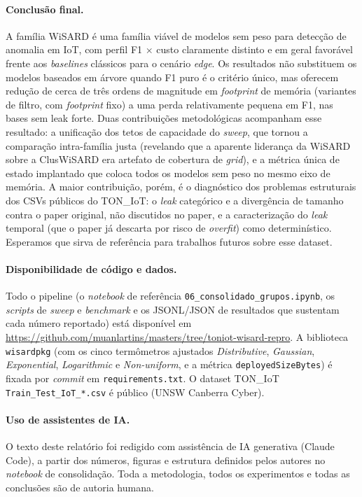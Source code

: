 \paragraph{Conclusão final.} A família WiSARD é uma família viável de
modelos sem peso para detecção de anomalia em IoT, com perfil
F1 $\times$ custo claramente distinto e em geral favorável frente aos
\emph{baselines} clássicos para o cenário \emph{edge}. Os resultados
não substituem os modelos baseados em árvore quando F1 puro é o
critério único, mas oferecem redução de cerca de três ordens de
magnitude em \emph{footprint} de memória (variantes de filtro, com
\emph{footprint} fixo) a uma perda relativamente pequena em F1, nas
bases sem leak forte. Duas contribuições metodológicas acompanham esse
resultado: a unificação dos tetos de capacidade do \emph{sweep}, que
tornou a comparação intra-família justa (revelando que a aparente
liderança da WiSARD sobre a ClusWiSARD era artefato de cobertura de
\emph{grid}), e a métrica única de estado implantado que coloca todos
os modelos sem peso no mesmo eixo de memória. A maior contribuição,
porém, é o diagnóstico dos problemas estruturais dos CSVs públicos do
TON\_IoT: o \emph{leak} categórico e a divergência de tamanho contra o
paper original, não discutidos no paper, e a caracterização do
\emph{leak} temporal (que o paper já descarta por risco de
\emph{overfit}) como determinístico. Esperamos que sirva de referência
para trabalhos futuros sobre esse dataset.

\paragraph{Disponibilidade de código e dados.} Todo o pipeline (o
\emph{notebook} de referência \texttt{06\_consolidado\_grupos.ipynb},
os \emph{scripts} de \emph{sweep} e \emph{benchmark} e os JSONL/JSON de
resultados que sustentam cada número reportado) está disponível em
\url{https://github.com/muanlartins/masters/tree/toniot-wisard-repro}.
A biblioteca \texttt{wisardpkg} (com os cinco termômetros ajustados
\emph{Distributive}, \emph{Gaussian}, \emph{Exponential},
\emph{Logarithmic} e \emph{Non-uniform}, e a métrica
\texttt{deployedSizeBytes}) é fixada por \emph{commit} em
\texttt{requirements.txt}. O dataset TON\_IoT
\texttt{Train\_Test\_IoT\_*.csv} é público (UNSW Canberra Cyber).

\paragraph{Uso de assistentes de IA.} O texto deste relatório foi
redigido com assistência de IA generativa (Claude Code), a partir
dos números, figuras e estrutura definidos pelos autores no
\emph{notebook} de consolidação. Toda a metodologia, todos os
experimentos e todas as conclusões são de autoria humana.
